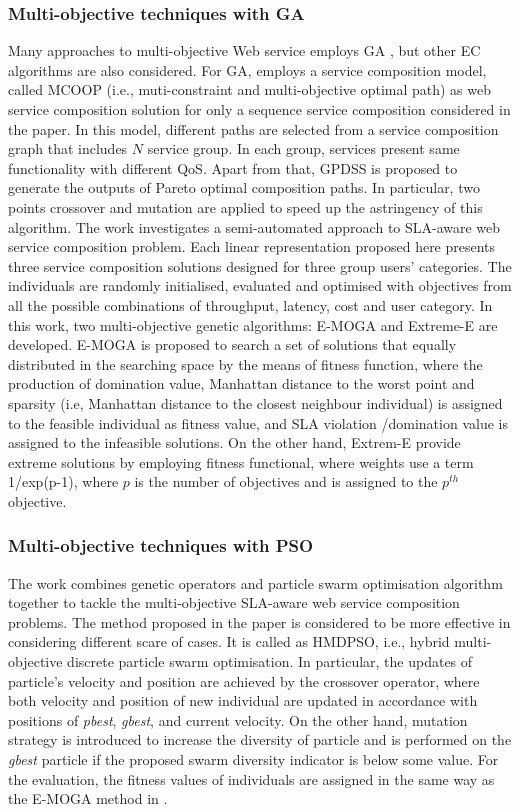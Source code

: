 \subsubsection{Multi-objective techniques with GA} Many approaches to multi-objective Web service employs GA \cite{liu2005dynamic}, but other EC algorithms are also considered. For GA, \cite{liu2005dynamic} employs a service composition model, called  MCOOP (i.e., muti-constraint and multi-objective optimal path) as web service composition solution for only a sequence service composition considered in the paper. In this model, different paths are selected from a service composition graph that includes $N$ service group. In each group,  services present same functionality with different QoS.  Apart from that, GPDSS is proposed to generate the outputs of Pareto optimal composition paths. In particular, two points crossover and mutation are applied to speed up the astringency of this algorithm. The work \cite{wada2012e3} investigates a semi-automated approach to SLA-aware web service composition problem.  Each linear representation proposed here presents three service composition solutions designed for three group users' categories.  The individuals are randomly initialised, evaluated and optimised with objectives from all the possible combinations of throughput, latency, cost and user category.  In this work, two multi-objective genetic algorithms: E-MOGA and Extreme-E are developed. E-MOGA is proposed to search a set of solutions that equally distributed in the searching space by the means of fitness function, where the production of domination value,  Manhattan distance to the worst point and sparsity (i.e, Manhattan distance to the closest neighbour individual)  is assigned to the feasible individual as fitness value, and SLA violation /domination value is assigned to the infeasible solutions. On the other hand, Extrem-E provide extreme solutions by employing fitness functional, where weights use a term 1/exp(p-1), where $p$ is the number of objectives and is assigned to the $p^{th}$ objective.

\subsubsection{Multi-objective techniques with PSO} The work \cite{yin2014hybrid} combines genetic operators and particle swarm optimisation algorithm together to tackle the multi-objective SLA-aware web service composition problems. The method proposed in the paper  is considered to be more effective in  considering different scare of cases.  It is called as HMDPSO, i.e., hybrid multi-objective discrete particle swarm optimisation. In particular, the updates of particle's velocity and position are achieved by the crossover operator, where both velocity and position of new individual are updated in accordance with positions of \textit{pbest}, \textit{gbest}, and current velocity. On the other hand, mutation strategy is introduced to increase the diversity of particle and is performed on the \textit{gbest} particle if the proposed swarm diversity indicator is below some value. For the evaluation,  the fitness values of individuals are assigned in the same way as the E-MOGA method in \cite{wada2012e3}.

